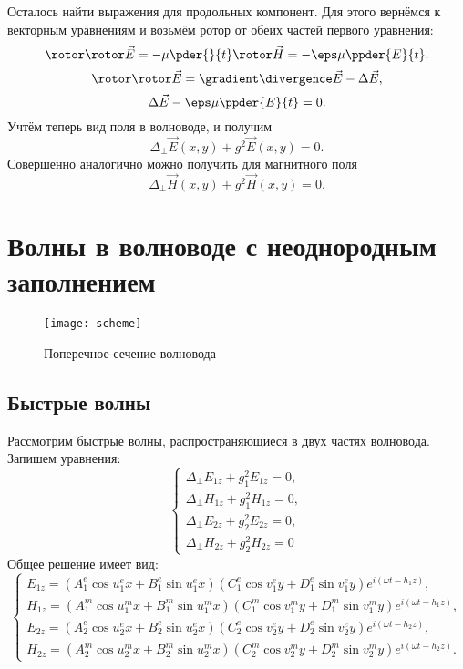 \documentclass[12pt]{hedsemwork}
\begin{document}
    Осталось найти выражения для продольных компонент. Для этого вернёмся к
    векторным уравнениям и возьмём ротор от обеих частей первого уравнения:
    \[
        \rotor\rotor\vec{E} = -\mu \pder{}{t}\rotor\vec{H} =
        -\eps\mu\ppder{E}{t}.
    \]
    \[
        \rotor\rotor\vec{E} = \gradient\divergence\vec{E} - \Delta\vec{E},
    \]
    \[
        \Delta\vec{E} - \eps\mu\ppder{E}{t} = 0.
    \]
    Учтём теперь вид поля в волноводе, и получим
    \[
        \Delta_\perp \vec{E}(x,y) + g^2\vec{E}(x,y) = 0.
    \]
    Совершенно аналогично можно получить для магнитного поля
    \[
        \Delta_\perp \vec{H}(x,y) + g^2\vec{H}(x,y) = 0.
    \]

\section{Волны в волноводе с неоднородным заполнением}
\begin{figure}[h]
    \center
    \texttt{[image: scheme]}
    \caption{Поперечное сечение волновода}
\end{figure}
\subsection{Быстрые волны}
    Рассмотрим быстрые волны, распространяющиеся в двух частях волновода.
    Запишем уравнения:
    \[
        \left\{
        \begin{array}{l}
            \Delta_\perp E_{1z} + g_1^2 E_{1z} = 0,\\
            \Delta_\perp H_{1z} + g_1^2 H_{1z} = 0,\\
            \Delta_\perp E_{2z} + g_2^2 E_{2z} = 0,\\
            \Delta_\perp H_{2z} + g_2^2 H_{2z} = 0
        \end{array}
        \right.
    \]
    Общее решение имеет вид:
    \[
        \left\{
        \begin{array}{l}
            E_{1z} =
            (A^e_1\cos u^e_1 x + B^e_1\sin u^e_1 x)
            (C^e_1\cos v^e_1 y + D^e_1\sin v^e_1 y)
            e^{i(\omega t - h_1 z)}, \\
            H_{1z} =
            (A^m_1\cos u^m_1 x + B^m_1\sin u^m_1 x)
            (C^m_1\cos v^m_1 y + D^m_1\sin v^m_1 y)
            e^{i(\omega t - h_1 z)}, \\
            E_{2z} =
            (A^e_2\cos u^e_2 x + B^e_2\sin u^e_2 x)
            (C^e_2\cos v^e_2 y + D^e_2\sin v^e_2 y)
            e^{i(\omega t - h_2 z)}, \\
            H_{2z} =
            (A^m_2\cos u^m_2 x + B^m_2\sin u^m_2 x)
            (C^m_2\cos v^m_2 y + D^m_2\sin v^m_2 y)
            e^{i(\omega t - h_2 z)}.
        \end{array}
        \right.
    \]
\end{document}
